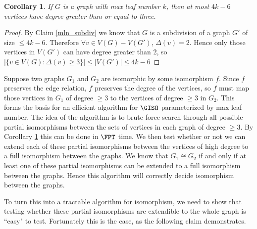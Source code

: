 \documentclass[11pt]{report}
\newtheorem{cor}{Corollary}
\begin{document}
\begin{cor} If $G$ is a graph with max leaf number $k$, then at most $4k-6$ vertices have degree greater than or equal to three. 
\label{cor_mln_vxs}
\end{cor}
\begin{proof}
By Claim \ref{mln_subdiv} we know that $G$ is a subdivision of a graph $G'$ of size $\leq 4k-6$. Therefore $\forall v \in V(G)-V(G')$, $\Delta(v)=2$. Hence only those vertices in $V(G')$ can have degree greater than 2, so $|\{ v\in V(G): \Delta(v) \geq 3  \}| \leq |V(G')| \leq 4k-6$
\end{proof}

Suppose two graphs $G_1$ and $G_2$ are isomorphic by some isomorphism $f$. Since $f$ preserves the edge relation, $f$ preserves the degree of the vertices, so $f$ must map those vertices in $G_1$ of degree $\geq3$ to the vertices of degree $\geq3$ in $G_2$. This forms the basis for an efficient algorithm for $\GISO$ parameterized by max leaf number. The idea of the algorithm is to brute force search through all possible partial isomorphisms between the sets of vertices in each graph of degree $\geq3$. By Corollary \ref{cor_mln_vxs} this can be done in $\FPT$ time. We then test whether or not we can extend each of these partial isomorphisms between the vertices of high degree to a full isomorphism between the graphs. We know that $G_1\cong G_2$ if and only if at least one of these partial isomorphisms can be extended to a full isomorphism between the graphs. Hence this algorithm will correctly decide isomorphism between the graphs.

To turn this into a tractable algorithm for isomorphism, we need to show that testing whether these partial isomorphisms  are extendible to the whole graph is ``easy" to test. Fortunately this is the case, as the following claim demonstrates.
\end{document}
